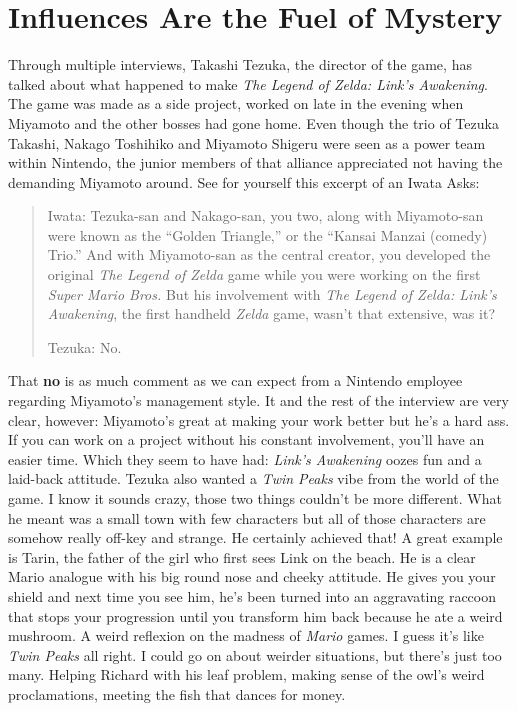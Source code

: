 \documentclass{book}
\begin{document}
\FloatBarrier\needspace{5pt}\section*{Influences Are the Fuel of Mystery}\nopagebreak[4]

Through multiple interviews, Takashi Tezuka, the director of the game, has talked about what happened to make \emph{The Legend of Zelda: Link’s Awakening}. The game was made as a side project, worked on late in the evening when Miyamoto and the other bosses had gone home. Even though the trio of Tezuka Takashi, Nakago Toshihiko and Miyamoto Shigeru were seen as a power team within Nintendo, the junior members of that alliance appreciated not having the demanding Miyamoto around. See for yourself this excerpt of an Iwata Asks:

\begin{quote}
Iwata: Tezuka-san and Nakago-san, you two, along with Miyamoto-san were known as the “Golden Triangle,” or the “Kansai Manzai (comedy) Trio.” And with Miyamoto-san as the central creator, you developed the original \emph{The Legend of Zelda} game while you were working on the first \emph{Super Mario Bros.} But his involvement with \emph{The Legend of Zelda: Link’s Awakening}, the first handheld \emph{Zelda} game, wasn’t that extensive, was it?

Tezuka: No.
\end{quote} \par

That \textbf{no} is as much comment as we can expect from a Nintendo employee regarding Miyamoto’s management style. It and the rest of the interview are very clear, however: Miyamoto’s great at making your work better but he’s a hard ass. If you can work on a project without his constant involvement, you’ll have an easier time. Which they seem to have had: \emph{Link’s Awakening} oozes fun and a laid-back attitude. Tezuka also wanted a \emph{Twin Peaks} vibe from the world of the game. I know it sounds crazy, those two things couldn’t be more different. What he meant was a small town with few characters but all of those characters are somehow really off-key and strange. He certainly achieved that! A great example is Tarin, the father of the girl who first sees Link on the beach. He is a clear Mario analogue with his big round nose and cheeky attitude. He gives you your shield and next time you see him, he’s been turned into an aggravating raccoon that stops your progression until you transform him back because he ate a weird mushroom. A weird reflexion on the madness of \emph{Mario} games. I guess it’s like \emph{Twin Peaks} all right. I could go on about weirder situations, but there’s just too many. Helping Richard with his leaf problem, making sense of the owl’s weird proclamations, meeting the fish that dances for money.
\end{document}
